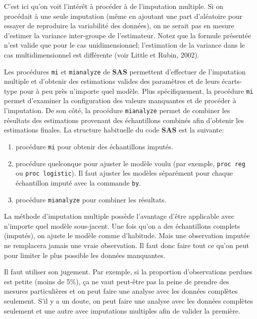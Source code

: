 \documentclass[
  11pt,
  letterpaper,
]{book}
\providecommand{\tightlist}{%
  \setlength{\itemsep}{0pt}\setlength{\parskip}{0pt}}
\theoremstyle{definition}
\theoremstyle{definition}
\theoremstyle{definition}
\theoremstyle{definition}
\theoremstyle{remark}
\begin{document}
C'est ici qu'on voit l'intérêt à procéder à de l'imputation multiple. Si on procédait à une seule imputation (même en ajoutant une part d'aléatoire pour essayer de reproduire la variabilité des données), on ne serait pas en mesure d'estimer la variance inter-groupe de l'estimateur. Notez que la formule présentée n'est valide que pour le cas unidimensionnel; l'estimation de la variance dans le cas multidimensionnel est différente (voir Little et Rubin, 2002).

Les procédures \texttt{mi} et \texttt{mianalyze} de \textbf{SAS} permettent d'effectuer de l'imputation multiple et d'obtenir des estimations valides des paramètres et de leurs écarts-type pour à peu près n'importe quel modèle. Plus spécifiquement, la procédure \texttt{mi} permet d'examiner la configuration des valeurs manquantes et de procéder à l'imputation. De son côté, la procédure \texttt{mianalyze} permet de combiner les résultats des estimations provenant des échantillons combinés afin d'obtenir les estimations finales. La structure habituelle du code \textbf{SAS} est la suivante:

\begin{enumerate}
\def\labelenumi{\arabic{enumi}.}
\tightlist
\item
  procédure \texttt{mi} pour obtenir des échantillons imputés.
\item
  procédure quelconque pour ajuster le modèle voulu (par exemple, \texttt{proc\ reg} ou \texttt{proc\ logistic}). Il faut ajuster les modèles séparément pour chaque échantillon imputé avec la commande \texttt{by}.
\item
  procédure \texttt{mianalyze} pour combiner les résultats.
\end{enumerate}

La méthode d'imputation multiple possède l'avantage d'être applicable avec n'importe quel modèle sous-jacent. Une fois qu'on a des échantillons complets (imputés), on ajuste le modèle comme d'habitude. Mais une observation imputée ne remplacera jamais une vraie observation. Il faut donc faire tout ce qu'on peut pour limiter le plus possible les données manquantes.

Il faut utiliser son jugement. Par exemple, si la proportion d'observations perdues est petite (moins de 5\%), ça ne vaut peut-être pas la peine de prendre des mesures particulières et on peut faire une analyse avec les données complètes seulement. S'il y a un doute, on peut faire une analyse avec les données complètes seulement et une autre avec imputations multiples afin de valider la première.
\end{document}
